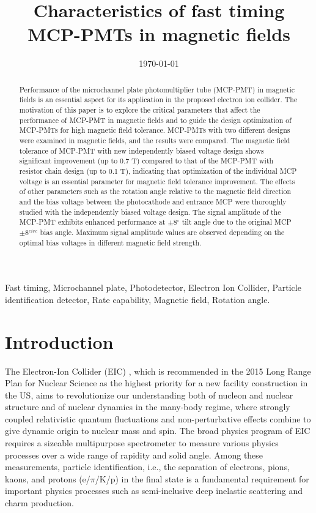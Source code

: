 \documentclass[preprint,5p]{elsarticle}
\title{\vspace{-15mm}\fontsize{18pt}{10pt}\selectfont\textbf{Characteristics of fast timing MCP-PMTs in magnetic fields}}
\date{\today}
\begin{document}
\begin{abstract}

Performance of the microchannel plate photomultiplier tube (MCP-PMT) in 
   magnetic fields is an essential aspect for its application in the proposed 
   electron ion collider. The motivation of this paper is to explore the 
   critical parameters that affect the performance of MCP-PMT in magnetic 
   fields and to guide the design optimization of MCP-PMTs for high magnetic 
   field tolerance. MCP-PMTs with two different designs were examined in 
   magnetic fields, and the results were compared. The magnetic field tolerance 
   of MCP-PMT with new independently biased voltage design shows significant 
   improvement (up to 0.7 T) compared to that of the MCP-PMT with resistor 
   chain design (up to 0.1 T), indicating that optimization of the individual 
   MCP voltage is an essential parameter for magnetic field tolerance 
   improvement. The effects of other parameters such as the rotation angle 
   relative to the magnetic field direction and the bias voltage between the 
   photocathode and entrance MCP were thoroughly studied with the independently 
   biased voltage design. The signal amplitude of the MCP-PMT exhibits enhanced 
   performance at $\pm$8$^{\circ}$ tilt angle due to the original MCP 
   $\pm$8$^{circ}$ bias angle.  Maximum signal amplitude values are observed 
   depending on the optimal bias voltages in different magnetic field strength.
\end{abstract}

\maketitle

\begin{keywords}
   Fast timing, Microchannel plate, Photodetector, Electron Ion Collider, 
   Particle identification detector, Rate capability, Magnetic field, Rotation 
   angle.
\end{keywords}




\section{Introduction} \label{sec:level1}
The Electron-Ion Collider (EIC) \cite{1}, which is recommended in the 2015 Long 
Range Plan for Nuclear Science \cite{2} as the highest priority for a new 
facility construction in the US, aims to revolutionize our understanding both 
of nucleon and nuclear structure and of nuclear dynamics in the many-body 
regime, where strongly coupled relativistic quantum fluctuations and 
non-perturbative effects combine to give dynamic origin to nuclear mass and 
spin. The broad physics program of EIC requires a sizeable multipurpose 
spectrometer to measure various physics processes over a wide range of rapidity 
and solid angle. Among these measurements, particle identification, i.e., the 
separation of electrons, pions, kaons, and protons (e/$\pi$/K/p) in the final 
state is a fundamental requirement for important physics processes such as 
semi-inclusive deep inelastic scattering and charm production.
\end{document}
